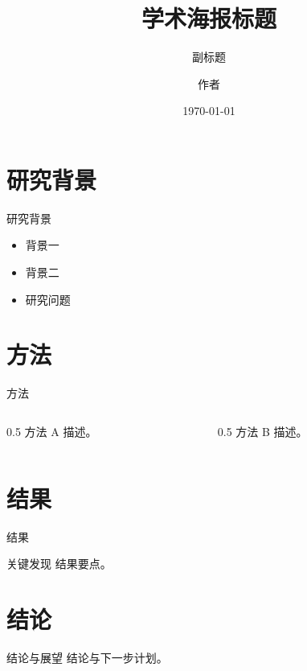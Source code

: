 \documentclass[20pt]{beamer}
\title{学术海报标题}
\subtitle{副标题}
\author{作者}
\institute{机构}
\date{\today}
\begin{document}
\begin{frame}[plain]
  \titlepage
\end{frame}

\section{研究背景}
\begin{frame}{研究背景}
  \begin{itemize}
    \item 背景一
    \item 背景二
    \item 研究问题
  \end{itemize}
\end{frame}

\section{方法}
\begin{frame}{方法}
  \begin{columns}
    \begin{column}{0.5\textwidth}
      方法 A 描述。
    \end{column}
    \begin{column}{0.5\textwidth}
      方法 B 描述。
    \end{column}
  \end{columns}
\end{frame}

\section{结果}
\begin{frame}{结果}
  \begin{block}{关键发现}
    结果要点。
  \end{block}
\end{frame}

\section{结论}
\begin{frame}{结论与展望}
  结论与下一步计划。
\end{frame}
\end{document}
